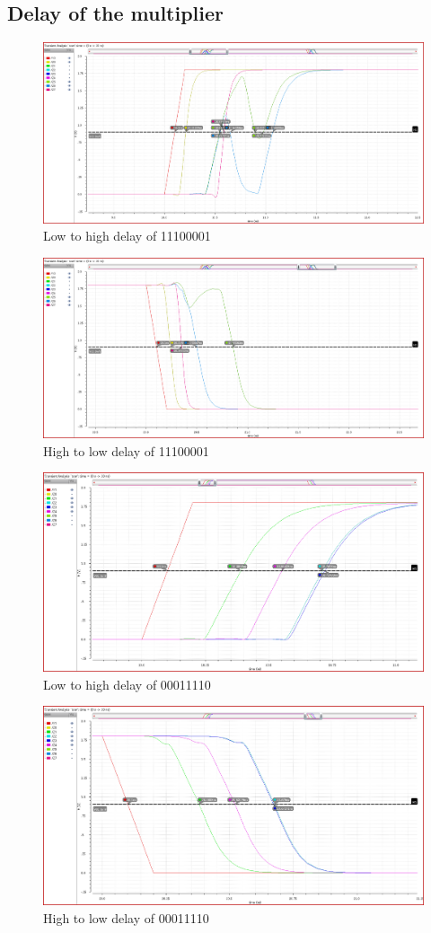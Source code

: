\documentclass[conference]{IEEEtran}
\begin{document}
\subsection{Delay of the multiplier}


\begin{figure}[h!]
    \centering
    \includegraphics[width=0.9\linewidth]{mul_11100001_up_all.png}
    \caption{Low to high delay of 11100001}
\end{figure}

\begin{figure}[h!]
    \centering
    \includegraphics[width=0.9\linewidth]{mul_11100001_down_all.png}
    \caption{High to low delay of 11100001}
\end{figure}

\begin{figure}[h!]
    \centering
    \includegraphics[width=0.9\linewidth]{mul_00011110_up_all.png}
    \caption{Low to high delay of 00011110}
\end{figure}

\begin{figure}[h!]
    \centering
    \includegraphics[width=0.9\linewidth]{mul_00011110_down_all.png}
    \caption{High to low delay of 00011110}
\end{figure}
\end{document}
